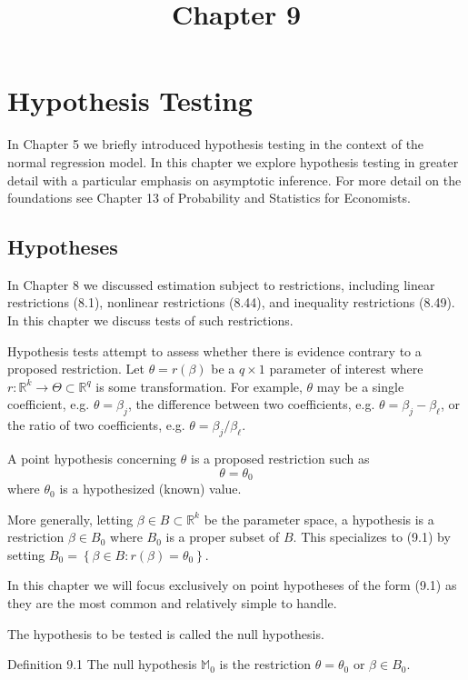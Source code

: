 \documentclass[10pt]{article}
\title{Chapter 9 }
\author{}
\date{}
\begin{document}
\maketitle
\section{Hypothesis Testing}
In Chapter 5 we briefly introduced hypothesis testing in the context of the normal regression model. In this chapter we explore hypothesis testing in greater detail with a particular emphasis on asymptotic inference. For more detail on the foundations see Chapter 13 of Probability and Statistics for Economists.

\subsection{Hypotheses}
In Chapter 8 we discussed estimation subject to restrictions, including linear restrictions (8.1), nonlinear restrictions (8.44), and inequality restrictions (8.49). In this chapter we discuss tests of such restrictions.

Hypothesis tests attempt to assess whether there is evidence contrary to a proposed restriction. Let $\theta=r(\beta)$ be a $q \times 1$ parameter of interest where $r: \mathbb{R}^{k} \rightarrow \Theta \subset \mathbb{R}^{q}$ is some transformation. For example, $\theta$ may be a single coefficient, e.g. $\theta=\beta_{j}$, the difference between two coefficients, e.g. $\theta=\beta_{j}-\beta_{\ell}$, or the ratio of two coefficients, e.g. $\theta=\beta_{j} / \beta_{\ell}$.

A point hypothesis concerning $\theta$ is a proposed restriction such as
$$
\theta=\theta_{0}
$$
where $\theta_{0}$ is a hypothesized (known) value.

More generally, letting $\beta \in B \subset \mathbb{R}^{k}$ be the parameter space, a hypothesis is a restriction $\beta \in B_{0}$ where $B_{0}$ is a proper subset of $B$. This specializes to (9.1) by setting $B_{0}=\left\{\beta \in B: r(\beta)=\theta_{0}\right\}$.

In this chapter we will focus exclusively on point hypotheses of the form (9.1) as they are the most common and relatively simple to handle.

The hypothesis to be tested is called the null hypothesis.

Definition 9.1 The null hypothesis $\mathbb{M}_{0}$ is the restriction $\theta=\theta_{0}$ or $\beta \in B_{0}$.
\end{document}
